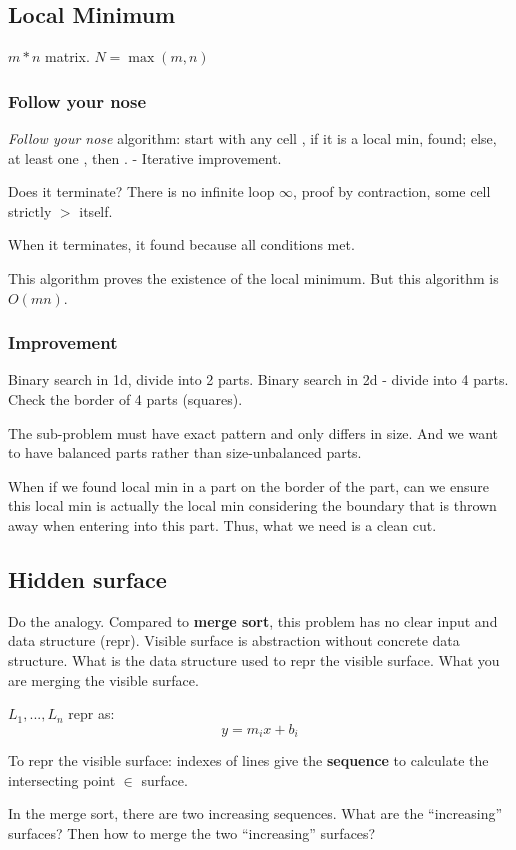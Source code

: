 \documentclass[a4paper]{report}
\begin{document}
\subsection*{Local Minimum}
$m*n$ matrix. $N=\max(m, n)$

\subsubsection*{Follow your nose} 
\textit{Follow your nose} algorithm: start with any cell , if it is a local min, found; else, at least one , then . - Iterative improvement. 

Does it terminate? There is no infinite loop $\infty$, proof by contraction, some cell strictly $>$ itself.

When it terminates, it found because all conditions met. 

This algorithm proves the existence of the local minimum. But this algorithm is $O(mn)$.
\subsubsection*{Improvement}
Binary search in 1d, divide into 2 parts. Binary search in 2d - divide into 4 parts. 
Check the border of 4 parts (squares). 

The sub-problem must have exact pattern and only differs in size. And we want to have balanced parts rather than size-unbalanced parts. 

When if we found local min in a part on the border of the part, can we ensure this local min is actually the local min considering the boundary that is thrown away when entering into this part. Thus, what we need is a clean cut. 

\subsection*{Hidden surface}
Do the analogy. 
Compared to \textbf{merge sort}, this problem has no clear input and data structure (repr). Visible surface is abstraction without concrete data structure. What is the data structure used to repr the visible surface. What you are merging the visible surface. 

$L_1, ..., L_n$ repr as:
$$
y=m_ix+b_i
$$

To repr the visible surface: indexes of lines give the \textbf{sequence} to calculate the intersecting point $\in$ surface. 

In the merge sort, there are two increasing sequences. What are  the ``increasing'' surfaces? Then how to merge the two ``increasing'' surfaces?
\end{document}
